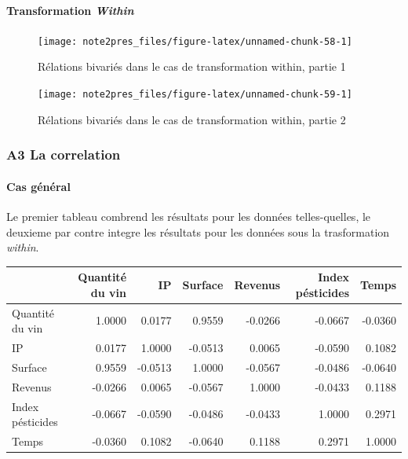 \documentclass[11pt,]{article}
\let\oldparagraph\paragraph
\renewcommand{\paragraph}[1]{\oldparagraph{#1}\mbox{}}
\begin{document}
\FloatBarrier

\hypertarget{transformation-within}{%
\paragraph{\texorpdfstring{Transformation
\emph{Within}}{Transformation Within}}\label{transformation-within}}

\FloatBarrier

\begin{figure}[!htbp]

{\centering \texttt{[image: note2pres\_files/figure-latex/unnamed-chunk-58-1]} 

}

\caption{Rélations bivariés dans le cas de transformation within, partie 1}\label{fig:unnamed-chunk-58}
\end{figure}

\FloatBarrier

\begin{figure}[!htbp]

{\centering \texttt{[image: note2pres\_files/figure-latex/unnamed-chunk-59-1]} 

}

\caption{Rélations bivariés dans le cas de transformation within, partie 2}\label{fig:unnamed-chunk-59}
\end{figure}

\FloatBarrier

\newpage

\hypertarget{a3-la-correlation}{%
\subsubsection{A3 La correlation}\label{a3-la-correlation}}

\hypertarget{cas-general-1}{%
\paragraph{Cas général}\label{cas-general-1}}

Le premier tableau combrend les résultats pour les données
telles-quelles, le deuxieme par contre integre les résultats pour les
données sous la trasformation \emph{within}.

\FloatBarrier

\begin{longtable}[]{@{}lrrrrrr@{}}
\toprule
& Quantité du vin & IP & Surface & Revenus & Index pésticides &
Temps\tabularnewline
\midrule
\endhead
Quantité du vin & 1.0000 & 0.0177 & 0.9559 & -0.0266 & -0.0667 &
-0.0360\tabularnewline
IP & 0.0177 & 1.0000 & -0.0513 & 0.0065 & -0.0590 &
0.1082\tabularnewline
Surface & 0.9559 & -0.0513 & 1.0000 & -0.0567 & -0.0486 &
-0.0640\tabularnewline
Revenus & -0.0266 & 0.0065 & -0.0567 & 1.0000 & -0.0433 &
0.1188\tabularnewline
Index pésticides & -0.0667 & -0.0590 & -0.0486 & -0.0433 & 1.0000 &
0.2971\tabularnewline
Temps & -0.0360 & 0.1082 & -0.0640 & 0.1188 & 0.2971 &
1.0000\tabularnewline
\bottomrule
\end{longtable}
\end{document}
